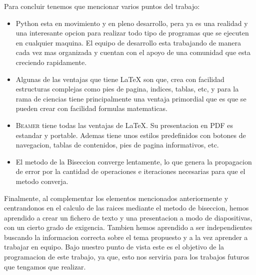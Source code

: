 
Para concluir tenemos que mencionar varios puntos del trabajo:

\begin{itemize}

\item \textsf{Python} esta en movimiento y en pleno desarrollo, pera ya es una realidad y una interesante opcion para realizar todo tipo de programas que se ejecuten en cualquier maquina. El equipo de desarrollo esta trabajando de manera cada vez mas organizada y cuentan con el apoyo de una comunidad que esta creciendo rapidamente.

\item Algunas de las ventajas que tiene \LaTeX{} son que, crea con facilidad estructuras complejas como pies de pagina, indices, tablas, etc, y para la rama de ciencias tiene principalmente una ventaja primordial que es que se pueden crear con facilidad formulas matematicas.

\item \textsc{Beamer} tiene todas las ventajas de \LaTeX{}. Su presentacion en PDF es estandar y portable. Ademas tiene unos estilos predefinidos con botones de navegacion, tablas de contenidos, pies de pagina informativos, etc.

\item El metodo de la Biseccion converge lentamente, lo que genera la propagacion de error por la cantidad de operaciones e iteraciones necesarias para que el metodo converja.

\end{itemize}

Finalmente, al complementar los elementos mencionados anteriormente y centrandonos en el calculo de las raices mediante el metodo de biseccion, hemos aprendido a crear un fichero de texto y una presentacion a modo de diapositivas, con un cierto grado de exigencia. Tambien hemos aprendido a ser independientes buscando la informacion correcta sobre el tema propuesto y a la vez aprender a trabajar en equipo.
Bajo nuestro punto de vista este es el objetivo de la programacion de este trabajo, ya que, esto nos serviria para los trabajos futuros que tengamos que realizar.